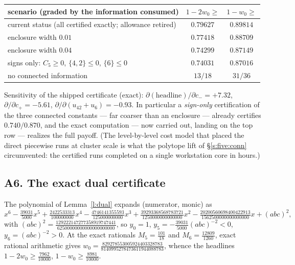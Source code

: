 \documentclass[11pt]{article}
\numberwithin{equation}{section}
\theoremstyle{definition}
\theoremstyle{remark}
\begin{document}
\begin{center}
\begin{tabular}{lcc}
scenario (graded by the information consumed) &
$1-2w_0\ge$ & $1-w_0\ge$\\
\hline
current status (all certified exactly; allowance retired) &
$0.79627$ & $0.89814$\\
enclosure width $0.01$ & $0.77418$ & $0.88709$\\
enclosure width $0.04$ & $0.74299$ & $0.87149$\\
signs only: $C_5\ge0$, $\{4,2\}\le0$, $\{6\}\le0$ &
$0.74031$ & $0.87016$\\
no connected information & $13/18$ & $31/36$\\
\end{tabular}
\end{center}

\noindent Sensitivity of the shipped certificate (exact):
$\partial(\text{headline})/\partial c_-=+7.32$,
$\partial/\partial c_+=-5.61$,
$\partial/\partial(u_{42}{+}u_6)=-0.93$. In particular a
\emph{sign-only} certification of the three connected constants
--- far coarser than an enclosure --- already certifies
$0.740/0.870$, and the exact computation --- now carried out,
landing on the top row --- realizes the full payoff. (The
level-by-level cost model that placed the direct piecewise
runs at cluster scale is what the polytope lift of
\S\ref{s:five:conn} circumvented: the certified runs completed
on a single workstation core in hours.)

\subsection*{A6. The exact dual certificate}

The polynomial of Lemma~\ref{l:dual} expands (numerator,
monic) as
\[
x^6-\tfrac{39031}{5000}x^5+\tfrac{2422533313}{100000000}x^4
-\tfrac{4746141355593}{125000000000}x^3
+\tfrac{39293368568783721}{1250000000000000}x^2
-\tfrac{20200560698400422913}{1562500000000000000}x
+(abc)^2,
\]
with $(abc)^2=\tfrac{129222147277358919747441}
{62500000000000000000000}$, so $y_0=1$,
$y_5=-\tfrac{39031}{5000}(abc)^{-2}<0$, $y_6=(abc)^{-2}>0$.
At the exact rationals $M_5=\tfrac{101}{18}$ and
$M_6=\tfrac{12809}{1260}$, exact rational arithmetic gives
$w_0=\tfrac{829278553005924403328783}
{8140995278473611944088783}$, whence the headlines
$1-2w_0\ge\tfrac{7962}{10000}$,
$1-w_0\ge\tfrac{8981}{10000}$.
\end{document}
